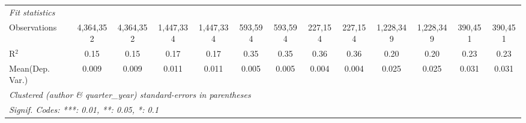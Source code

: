 \begin{tabular}{lcccccccccccc}
   \midrule
   \emph{Fit statistics}\\
   Observations                             & 4,364,352     & 4,364,352      & 1,447,334     & 1,447,334       & 593,594  & 593,594        & 227,154 & 227,154        & 1,228,349     & 1,228,349      & 390,451       & 390,451\\  
   R$^2$                                    & 0.15          & 0.15           & 0.17          & 0.17            & 0.35     & 0.35           & 0.36    & 0.36           & 0.20          & 0.20           & 0.23          & 0.23\\  
Mean(Dep. Var.) & 0.009 & 0.009 & 0.011 & 0.011 & 0.005 & 0.005 & 0.004 & 0.004 & 0.025 & 0.025 & 0.031 & 0.031 \\
   \midrule \midrule
   \multicolumn{13}{l}{\emph{Clustered (author \& quarter\_year) standard-errors in parentheses}}\\
   \multicolumn{13}{l}{\emph{Signif. Codes: ***: 0.01, **: 0.05, *: 0.1}}\\
\end{tabular}
\par\endgroup
